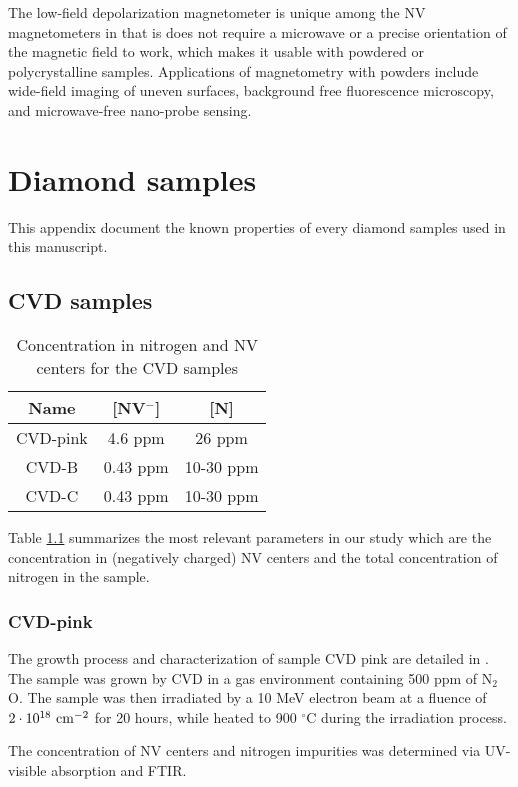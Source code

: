 \documentclass[a4paper, 11pt]{book}
\begin{document}
The low-field depolarization magnetometer is unique among the NV magnetometers in that is does not require a microwave or a precise orientation of the magnetic field to work, which makes it usable with powdered or polycrystalline samples. Applications of magnetometry with powders include wide-field imaging of uneven surfaces, background free fluorescence microscopy, and microwave-free nano-probe sensing.


\appendix
 
\chapter{Diamond samples}
This appendix document the known properties of every diamond samples used in this manuscript.

\section{CVD samples}
\begin{table}[htbp]
\centering
\caption{Concentration in nitrogen and NV centers for the CVD samples}
\label{Table samples CVD}
\begin{tabular}{c|cc}
\toprule
Name &  [NV$^-$]  & [N] \\
\midrule
CVD-pink & 4.6 ppm & 26 ppm \\
CVD-B & 0.43 ppm & 10-30 ppm \\
CVD-C & 0.43 ppm & 10-30 ppm \\

\bottomrule
\end{tabular}
\end{table}
Table \ref{Table samples CVD} summarizes the most relevant parameters in our study which are the concentration in (negatively charged) NV centers and the total concentration of nitrogen in the sample.
\subsection{CVD-pink}
The growth process and characterization of sample CVD pink are detailed in \citep{tallaire2020high}. The sample was grown by CVD in a gas environment containing 500 ppm of N$_2$O. The sample was then irradiated by a 10 MeV electron beam at a fluence of $2\cdot 10^{18}\ \rm cm^{-2}$ for 20 hours, while heated to 900 $^\circ$C during the irradiation process.

The concentration of NV centers and nitrogen impurities was determined via UV-visible absorption and FTIR.
\end{document}
